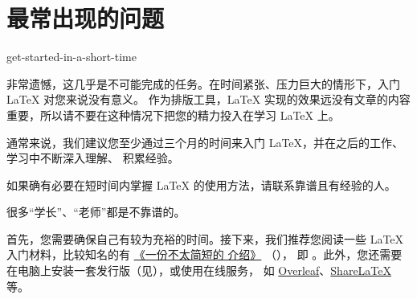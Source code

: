 %
%
%
%


\section{最常出现的问题}
\label{sec:starter}

%
  {get-started-in-a-short-time}

非常遗憾，这几乎是不可能完成的任务。在时间紧张、压力巨大的情形下，入门 \LaTeX{} 对您来说没有意义。
作为排版工具，\LaTeX{} 实现的效果远没有文章的内容重要，所以请不要在这种情况下把您的精力投入在学习
\LaTeX{} 上。

通常来说，我们建议您至少通过三个月的时间来入门 \LaTeX{}，并在之后的工作、学习中不断深入理解、
积累经验。

如果确有必要在短时间内掌握 \LaTeX{} 的使用方法，请联系靠谱且有经验的人。

\begin{note}
  很多“学长”、“老师”都是不靠谱的。
\end{note}



首先，您需要确保自己有较为充裕的时间。接下来，我们推荐您阅读一些 \LaTeX{} 入门材料，比较知名的有
\href{http://mirrors.ctan.org/info/lshort/chinese/lshort-zh-cn.pdf}{《一份不太简短的 \LaTeXe{} 介绍》}
（\href{http://mirrors.ctan.org/info/lshort/english/lshort.pdf}{}），
即 。此外，您还需要在电脑上安装一套发行版（见），或使用在线服务，
如 \href{https://www.overleaf.com/}{Overleaf}、\href{https://www.sharelatex.com}{ShareLaTeX} 等。

